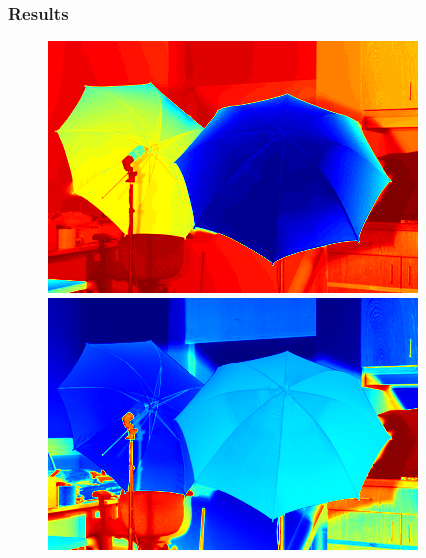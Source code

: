 \documentclass{beamer}
\begin{document}

\begin{frame}
  \frametitle{Results}
  \begin{figure}[ht]
    \begin{minipage}[b]{0.40\linewidth}
      \centering
      \includegraphics[width=\textwidth]{./Images/Umbrella/evecColor.png}
    \end{minipage}
    \begin{minipage}[b]{0.40\linewidth}
      \centering
      \includegraphics[width=\textwidth]{./Images/Umbrella/evec2.png}
    \end{minipage}
    \vfill
    \begin{minipage}[b]{0.40\linewidth}
      \centering

\end{minipage}
\end{figure}
\end{frame}
\end{document}
